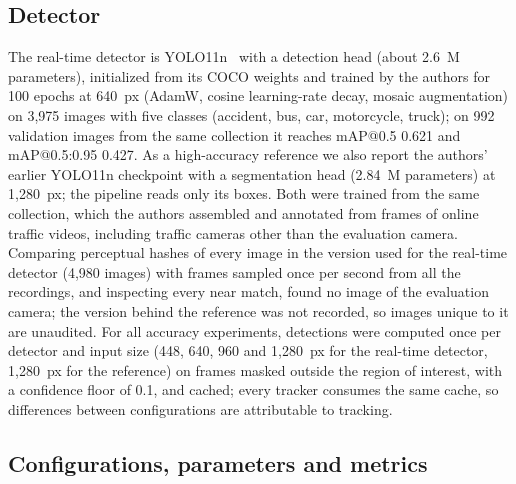 \documentclass[twocolumn]{svjour3}
\begin{document}
\subsection{Detector}\label{subsec:detector}

The real-time detector is YOLO11n~\cite{Jocher2024_yolo11} with a detection
head (about 2.6~M parameters), initialized from its COCO weights and trained by
the authors for 100 epochs at 640~px (AdamW, cosine learning-rate decay, mosaic
augmentation) on 3,975 images with five classes (accident, bus, car,
motorcycle, truck); on 992 validation images from the same collection it
reaches mAP@0.5 0.621 and mAP@0.5:0.95 0.427. As a high-accuracy reference we
also report the authors' earlier YOLO11n checkpoint with a segmentation head
(2.84~M parameters) at 1,280~px; the pipeline reads only its boxes. Both were
trained from the same collection, which the authors assembled and annotated from
frames of online traffic videos, including traffic cameras other than the
evaluation camera. Comparing perceptual hashes of
every image in the version used for the real-time detector (4,980 images) with
frames sampled once per second from all the recordings, and inspecting every
near match, found no image of the evaluation camera; the version behind the
reference was not recorded, so images unique to it are unaudited.
For all
accuracy experiments, detections were computed once per detector and input size
(448, 640, 960 and 1,280~px for the real-time detector, 1,280~px for the
reference) on frames masked outside the region of interest, with a confidence
floor of 0.1, and cached;
every tracker consumes the same cache, so differences between configurations
are attributable to tracking.

\subsection{Configurations, parameters and metrics}\label{subsec:configs}
\end{document}
